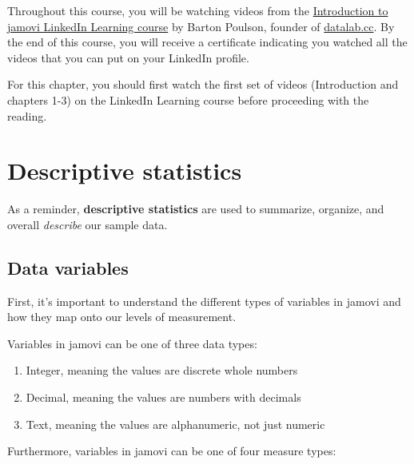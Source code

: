 \documentclass[
]{book}
\providecommand{\tightlist}{%
  \setlength{\itemsep}{0pt}\setlength{\parskip}{0pt}}
\begin{document}
Throughout this course, you will be watching videos from the \href{https://www.linkedin.com/learning/introduction-to-jamovi/}{Introduction to jamovi LinkedIn Learning course} by Barton Poulson, founder of \href{https://datalab.cc/jamovi/}{datalab.cc}. By the end of this course, you will receive a certificate indicating you watched all the videos that you can put on your LinkedIn profile.

For this chapter, you should first watch the first set of videos (Introduction and chapters 1-3) on the LinkedIn Learning course before proceeding with the reading.

\hypertarget{descriptive-statistics}{%
\section{Descriptive statistics}\label{descriptive-statistics}}

As a reminder, \textbf{descriptive statistics} are used to summarize, organize, and overall \emph{describe} our sample data.

\hypertarget{data-variables}{%
\subsection{Data variables}\label{data-variables}}

First, it's important to understand the different types of variables in jamovi and how they map onto our levels of measurement.

Variables in jamovi can be one of three data types:

\begin{enumerate}
\def\labelenumi{\arabic{enumi}.}
\tightlist
\item
  Integer, meaning the values are discrete whole numbers
\item
  Decimal, meaning the values are numbers with decimals
\item
  Text, meaning the values are alphanumeric, not just numeric
\end{enumerate}

Furthermore, variables in jamovi can be one of four measure types:
\end{document}

